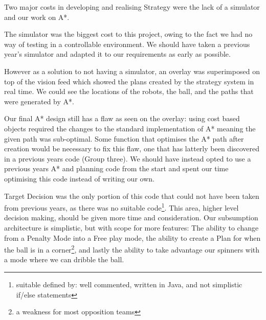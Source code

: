
Two major costs in developing and realising Strategy were the lack of a 
simulator and our work on A*. 

The simulator was the biggest cost to this project, owing to the fact we had
no way of testing in a controllable environment. We should
have taken a previous year's simulator and adapted it to our requirements as
early as possible. 

However as a solution to not having a simulator, an overlay was superimposed on
top of the vision feed which showed the plans created by the strategy system in
real time. We could see the locations of the robots, the ball, and the paths
that were generated by A*. 

Our final A* design still has a flaw as seen on the overlay: using cost based
objects required the changes to the standard implementation of A* meaning the
given path was sub-optimal. Some function that optimises the A* path after
creation would be necessary to fix this flaw, one that has latterly been
discovered in a previous years code (Group three). We should have instead opted
to use a previous years A* and planning code from the start and spent our time
optimising this code instead of writing our own.

Target Decision was the only portion of this code that could not have been
taken from previous years, as there was no suitable code\footnote{suitable
defined by: well commented, written in Java, and not simplistic if/else
statements}. This area, higher level decision making, should be given more time
and consideration.  Our subsumption architecture is simplistic, but with scope
for more features: The ability to change from a Penalty Mode into a Free play
mode, the ability to create a Plan for when the ball is in a corner\footnote{a
weakness for most opposition teams}, and lastly the ability to take advantage
our spinners with a mode where we can dribble the ball.


